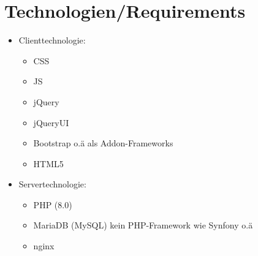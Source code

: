\documentclass{article}
\begin{document}
\pagebreak
\section{Technologien/Requirements}

\begin{itemize}
    \item Clienttechnologie: 
    \begin{itemize}
        \item CSS\\
        \item JS\\
        \item jQuery\\
        \item jQueryUI\\
        \item Bootstrap o.ä als Addon-Frameworks\\
        \item HTML5
    \end{itemize}
    
    \item Servertechnologie: 
    \begin{itemize}
        \item PHP (8.0)
        \item MariaDB (MySQL) kein PHP-Framework wie Synfony o.ä\\
        \item nginx
    \end{itemize}
    

\end{itemize}
\end{document}
